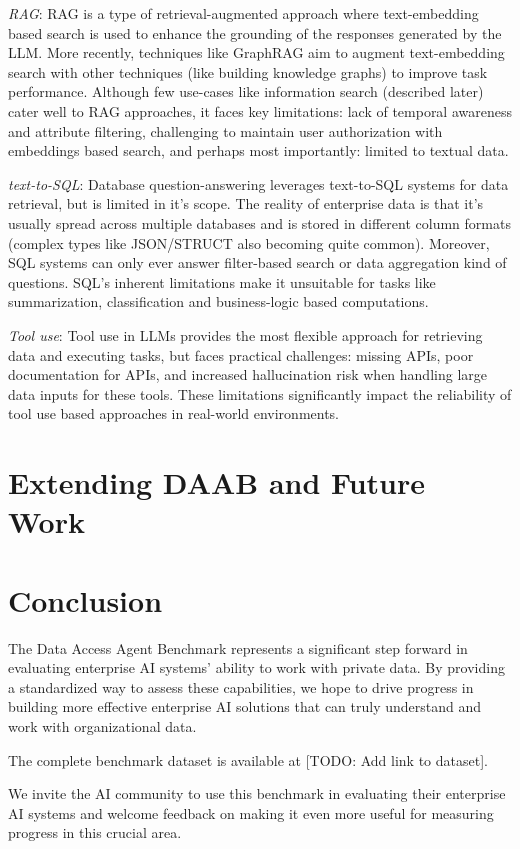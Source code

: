 \documentclass[11pt,a4paper]{article}
\begin{document}
\textit{RAG}: RAG is a type of retrieval-augmented approach\cite{realm,rag,trillion} where text-embedding based search is used to enhance the grounding of the responses generated by the LLM. More recently, techniques like GraphRAG\cite{graphrag} aim to augment text-embedding search with other techniques (like building knowledge graphs) to improve task performance. Although few use-cases like information search (described later) cater well to RAG approaches, it faces key limitations: lack of temporal awareness and attribute filtering, challenging to maintain user authorization with embeddings based search, and perhaps most importantly: limited to textual data.

\textit{text-to-SQL}: Database question-answering leverages text-to-SQL\cite{text-to-sql} systems for data retrieval, but is limited in it's scope. The reality of  enterprise data is that it's usually spread across multiple databases and is stored in different column formats (complex types like JSON/STRUCT also becoming quite common). Moreover, SQL systems can only ever answer filter-based search or data aggregation kind of questions. SQL's inherent limitations make it unsuitable for tasks like summarization, classification and business-logic based computations.

\textit{Tool use}: Tool use\cite{toolformer,react} in LLMs provides the most flexible approach for retrieving data and executing tasks, but faces practical challenges: missing APIs, poor documentation for APIs, and increased hallucination risk when handling large data inputs for these tools. These limitations significantly impact the reliability of tool use based approaches in real-world environments.


\section{Extending DAAB and Future Work}



\section{Conclusion}

The Data Access Agent Benchmark represents a significant step forward in evaluating enterprise AI systems' ability to work with private data. By providing a standardized way to assess these capabilities, we hope to drive progress in building more effective enterprise AI solutions that can truly understand and work with organizational data.

The complete benchmark dataset is available at [TODO: Add link to dataset].

We invite the AI community to use this benchmark in evaluating their enterprise AI systems and welcome feedback on making it even more useful for measuring progress in this crucial area.



\printbibliography
\end{document}
